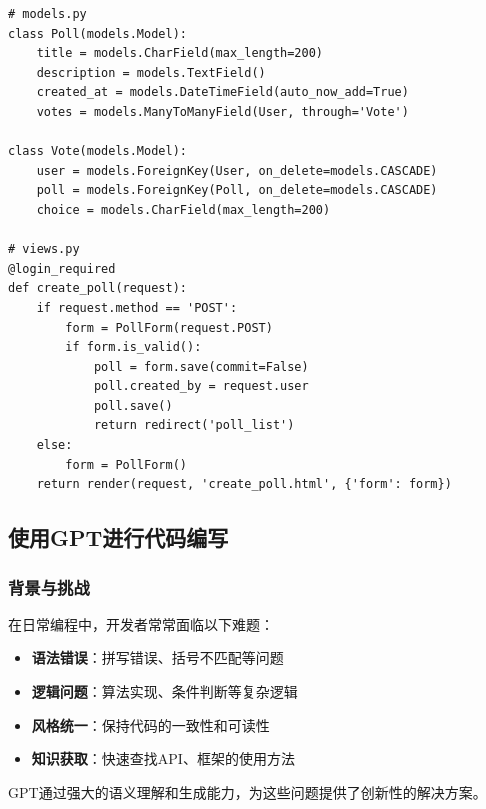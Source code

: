 \begin{enumerate}
\begin{itemize}
                \begin{lstlisting}
# models.py
class Poll(models.Model):
    title = models.CharField(max_length=200)
    description = models.TextField()
    created_at = models.DateTimeField(auto_now_add=True)
    votes = models.ManyToManyField(User, through='Vote')

class Vote(models.Model):
    user = models.ForeignKey(User, on_delete=models.CASCADE)
    poll = models.ForeignKey(Poll, on_delete=models.CASCADE)
    choice = models.CharField(max_length=200)

# views.py
@login_required
def create_poll(request):
    if request.method == 'POST':
        form = PollForm(request.POST)
        if form.is_valid():
            poll = form.save(commit=False)
            poll.created_by = request.user
            poll.save()
            return redirect('poll_list')
    else:
        form = PollForm()
    return render(request, 'create_poll.html', {'form': form})
\end{lstlisting}
        \end{itemize}
\end{enumerate}

\hypertarget{ux4f7fux7528gptux8fdbux884cux4ee3ux7801ux7f16ux5199}{%
  \subsection{使用GPT进行代码编写}\label{ux4f7fux7528gptux8fdbux884cux4ee3ux7801ux7f16ux5199}}

\hypertarget{ux80ccux666fux4e0eux6311ux6218-1}{%
  \subsubsection{背景与挑战}\label{ux80ccux666fux4e0eux6311ux6218-1}}

在日常编程中，开发者常常面临以下难题：

\begin{itemize}
  \item
        \textbf{语法错误}：拼写错误、括号不匹配等问题
  \item
        \textbf{逻辑问题}：算法实现、条件判断等复杂逻辑
  \item
        \textbf{风格统一}：保持代码的一致性和可读性
  \item
        \textbf{知识获取}：快速查找API、框架的使用方法
\end{itemize}

GPT通过强大的语义理解和生成能力，为这些问题提供了创新性的解决方案。

